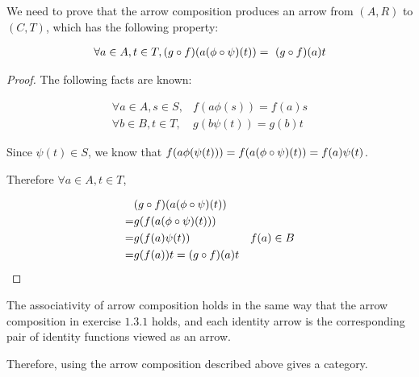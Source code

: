 \documentclass[11pt]{article}
\begin{document}
We need to prove that the arrow composition produces an arrow from $(A,R)$ to $(C,T)$,
which has the following property:

\begin{align*}
  \forall a \in A, t \in T, (g \circ f)(a (\phi \circ \psi)(t)) = \
  (g \circ f)(a)t
\end{align*}

\begin{proof}
  The following facts are known:

  \begin{align*}
    \forall a \in A, s \in S, & f(a\phi(s)) = f(a)s \\
    \forall b \in B, t \in T, & g(b\psi(t)) = g(b)t
  \end{align*}

  Since $\psi(t) \in S$, we know that
  $ f(a \phi(\psi(t))) = f(a (\phi \circ \psi)(t)) = f(a) \psi(t) $.

  Therefore $\forall a \in A, t \in T$,

  \begin{align*}
    & (g \circ f)(a (\phi \circ \psi)(t)) \\
    = & g(f(a (\phi \circ \psi)(t)) ) \\
    = & g(f(a) \psi(t) ) & f(a) \in B \\
    = & g(f(a))t = (g \circ f)(a)t
  \end{align*}

\end{proof}

The associativity of arrow composition holds in the same way that
the arrow composition in exercise $1.3.1$ holds, and each identity arrow
is the corresponding pair of identity functions viewed as an arrow.

Therefore, using the arrow composition described above
gives a category.
\end{document}
